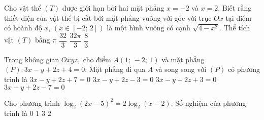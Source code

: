 \begin{ex}%
Cho vật thể $( T )$ được giới hạn bởi hai mặt phẳng $x=-2$ và $x=2$. Biết rằng thiết diện của vật thể bị cắt bởi mặt phẳng vuông với góc với trục $Ox$ tại điểm có hoành độ $x$, $\left( x\in [ -2;\,2 ] \right)$ là một hình vuông có cạnh $\sqrt{4-x^2}$. Thể tích vật $( T )$ bằng
\choice 
{ $\pi $}
{ \True $\dfrac{32}{3}$}
{ $\dfrac{32\pi }{3}$}
{ $\dfrac{8}{3}$}
\end{ex} 

\begin{ex}%
Trong không gian $Oxyz,$ cho điểm $A( 1;\,-2;\,1 )$ và mặt phẳng $( P )\colon 3x-y+2z+4=0$. Mặt phẳng đi qua $A$ và song song với $( P )$ có phương trình là
\choice 
{ $3x-y+2z+7=0$}
{ $3x-y+2z-3=0$}
{ $3x-y+2z+3=0$}
{ \True $3x-y+2z-7=0$}
\end{ex}

\begin{ex}%
Cho phương trình $\log_2(2x-5)^2=2\log_2(x-2)$. Số nghiệm của phương trình là
	\choice
	{ $0$}
	{$1$}
	{$3$}
	{\True $2$}
\end{ex}

